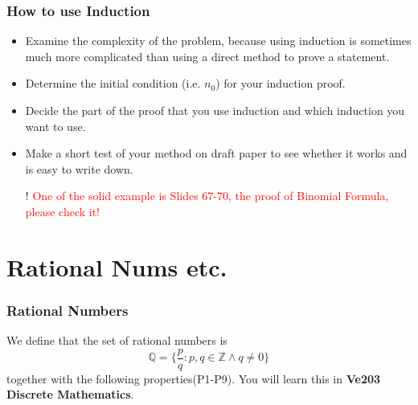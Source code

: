 \documentclass{beamer}
\begin{document}
\begin{frame}
    \frametitle{How to use Induction}
    \begin{itemize}
        \item Examine the complexity of the problem, because using induction is sometimes much more
            complicated than using a direct method to prove a statement.
        \item Determine the initial condition (i.e. $n_0$) for your induction proof.
        \item Decide the part of the proof that you use induction and which induction you want to use.
        \item Make a short test of your method on draft paper to see whether it works and is easy to write down.
    \end{itemize}
    \begin{itemize}
        \item[!] \textcolor{red}{One of the solid example is Slides 67-70, the proof of Binomial Formula, please check it!}
    \end{itemize}
\end{frame}
\section{Rational Nums etc.}
\begin{frame}
    \frametitle{Rational Numbers}
    \hspace{1em}
    We define that the set of rational numbers is 
    \begin{equation*}
        \mathbb{Q}=\{\frac{p}{q}:p,q\in \mathbb{Z}\wedge q \neq 0\}
    \end{equation*}
    together with the following properties(P1-P9). You will learn this in 
    \textbf{Ve203 Discrete Mathematics}.
    \begin{table}
        \centering
    \end{table}
\end{frame}    
\end{document}
